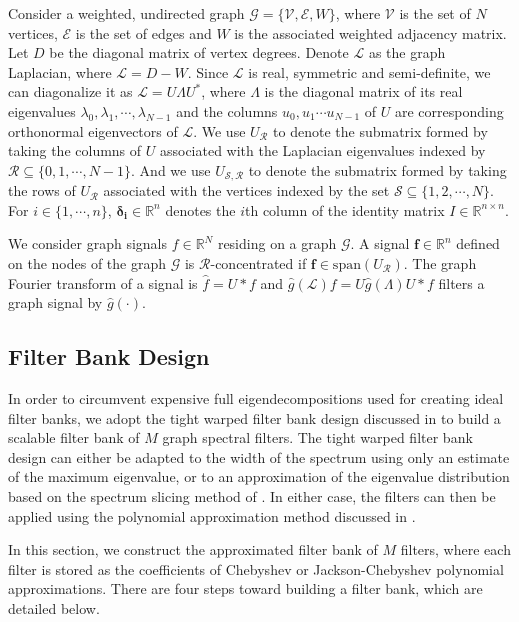 \documentclass[a4paper]{article}
\newcommand{\R}{\mathcal{R}}
\newcommand{\RR}{\mathbb{R}}
\newcommand{\G}{\mathcal{G}}
\newcommand{\V}{\mathcal{V}}
\newcommand{\E}{\mathcal{E}}
\newcommand{\La}{\mathcal{L}}
\newcommand{\UR}{U_{\mathcal{R}}}
\theoremstyle{definition}
\begin{document}
Consider a weighted, undirected graph $\G = \{ \V, \E, W\}$, where $\V$ is the set of $N$ vertices, $\E$ is the set of edges and $W$ is the associated weighted adjacency matrix. Let $D$ be the diagonal matrix of vertex degrees. Denote $\La$ as the graph Laplacian, where $\La = D-W$. Since $\La$ is real, symmetric and semi-definite, we can diagonalize it as $\La =U\Lambda U^*$, where $\Lambda$ is the diagonal matrix of its real eigenvalues $\lambda_0, \lambda_1,\cdots, \lambda_{N-1}$ and the columns $u_0, u_1 \cdots u_{N-1}$ of $U$ are corresponding orthonormal eigenvectors of $\La$. We use $\UR$ to denote the submatrix formed by taking the columns of $U$ associated with the Laplacian eigenvalues indexed by $\mathcal{R} \subseteq \{0,1,\cdots,N-1\}$. And we use $U_{\mathcal{S},\mathcal{R}}$ to denote the submatrix formed by taking the rows of $U_{\mathcal{R}}$ associated with the vertices indexed by the set $\mathcal{S} \subseteq \{1,2,\cdots, N\}$. For $i \in \{1,\cdots,n\}$, $\bm{\delta_i} \in \RR^n$ denotes the $i$th column of the identity matrix $I \in \RR^{n\times n}.$

We consider graph signals $f \in \RR^N$ residing on a graph $\G$. A signal $\bm{f} \in \RR^n$ defined on the nodes of the graph $\G$ is $\R$-concentrated if $\bm{f} \in \text{span}(U_{\R})$. The graph Fourier transform of a signal is $\hat{f} = U*f$ and $\hat{g}(\La)f = U\hat{g}(\Lambda)U*f$ filters a graph signal by $\hat{g}(\cdot)$.



\subsection{Filter Bank Design}

In order to circumvent expensive full eigendecompositions used for creating ideal filter banks, we adopt the tight warped filter bank design discussed in \cite{shuman2013spectrum} to build a scalable filter bank of $M$ graph spectral filters. The tight warped filter bank design can either be adapted to the width of the spectrum using only an estimate of the maximum eigenvalue, or to an approximation of the eigenvalue distribution based on the spectrum slicing method of \cite[Section 3.3]{parlett}. In either case, the filters can then be applied using the polynomial approximation method discussed in \cite{hammond2011wavelets,shuman_DCOSS_2011}.

In this section, we construct the approximated filter bank of $M$ filters, where each filter is stored as the coefficients of Chebyshev or Jackson-Chebyshev polynomial approximations. There are four steps toward building a filter bank, which are detailed below.
\end{document}
